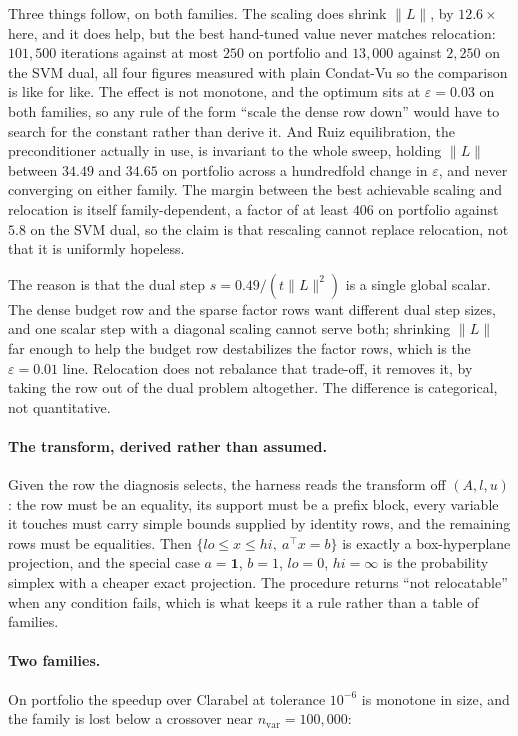 \documentclass[11pt]{article}
\begin{document}
Three things follow, on both families. The scaling does shrink $\|L\|$, by
$12.6\times$ here, and it does help, but the best hand-tuned value never
matches relocation: $101{,}500$ iterations against at most $250$ on
portfolio and $13{,}000$ against $2{,}250$ on the SVM dual, all four figures
measured with plain Condat-Vu so the comparison is like for like. The effect
is not monotone, and the optimum sits at $\varepsilon=0.03$ on both
families, so any rule of the form ``scale the dense row down'' would have to
search for the constant rather than derive it. And Ruiz equilibration, the
preconditioner actually in use, is invariant to the whole sweep, holding
$\|L\|$ between $34.49$ and $34.65$ on portfolio across a hundredfold change
in $\varepsilon$, and never converging on either family. The margin between
the best achievable scaling and relocation is itself family-dependent, a
factor of at least $406$ on portfolio against $5.8$ on the SVM dual, so the
claim is that rescaling cannot replace relocation, not that it is uniformly
hopeless.

The reason is that the dual step $s = 0.49/(t\|L\|^2)$ is a single global
scalar. The dense budget row and the sparse factor rows want different dual
step sizes, and one scalar step with a diagonal scaling cannot serve both;
shrinking $\|L\|$ far enough to help the budget row destabilizes the factor
rows, which is the $\varepsilon=0.01$ line. Relocation does not rebalance
that trade-off, it removes it, by taking the row out of the dual problem
altogether. The difference is categorical, not quantitative.

\paragraph{The transform, derived rather than assumed.}
Given the row the diagnosis selects, the harness reads the transform off
$(A,l,u)$: the row must be an equality, its support must be a prefix block,
every variable it touches must carry simple bounds supplied by identity
rows, and the remaining rows must be equalities. Then
$\{lo \le x \le hi,\ a^\top x = b\}$ is exactly a box-hyperplane projection,
and the special case $a=\mathbf{1}$, $b=1$, $lo=0$, $hi=\infty$ is the
probability simplex with a cheaper exact projection. The procedure returns
``not relocatable'' when any condition fails, which is what keeps it a rule
rather than a table of families.

\paragraph{Two families.}
On portfolio the speedup over Clarabel at tolerance $10^{-6}$ is monotone in
size, and the family is lost below a crossover near $n_{\mathrm{var}} =
100{,}000$:
\end{document}
